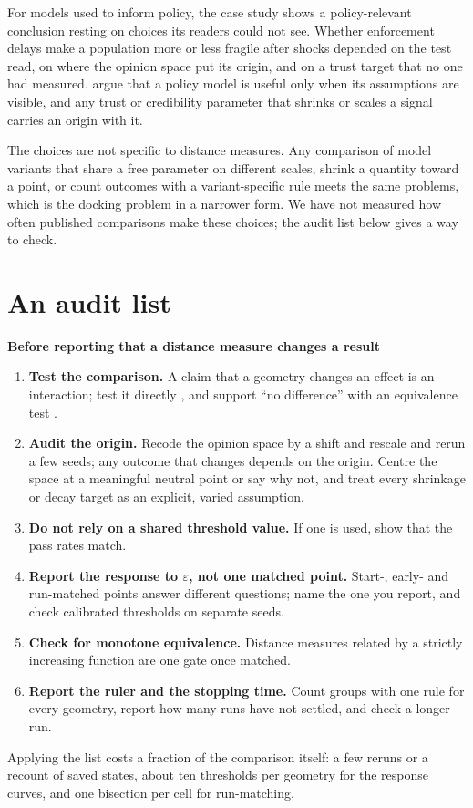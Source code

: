 \documentclass[11pt]{article}
\begin{document}
For models used to inform policy, the case study shows a policy-relevant conclusion resting on choices its readers could not see.
Whether enforcement delays make a population more or less fragile after shocks depended on the test read, on where the opinion space put its origin, and on a trust target that no one had measured.
\citet{gilbert2018} argue that a policy model is useful only when its assumptions are visible, and any trust or credibility parameter that shrinks or scales a signal carries an origin with it.

The choices are not specific to distance measures.
Any comparison of model variants that share a free parameter on different scales, shrink a quantity toward a point, or count outcomes with a variant-specific rule meets the same problems, which is the docking problem \citep{axtell1996,wilensky2007} in a narrower form.
We have not measured how often published comparisons make these choices; the audit list below gives a way to check.

\section{An audit list}
\label{sec:protocol}

\begin{framed}
\noindent\textbf{Before reporting that a distance measure changes a result}
\begin{enumerate}
\item \textbf{Test the comparison.} A claim that a geometry changes an effect is an interaction; test it directly \citep{gelman2006}, and support ``no difference'' with an equivalence test \citep{lakens2017}.
\item \textbf{Audit the origin.} Recode the opinion space by a shift and rescale and rerun a few seeds; any outcome that changes depends on the origin. Centre the space at a meaningful neutral point or say why not, and treat every shrinkage or decay target as an explicit, varied assumption.
\item \textbf{Do not rely on a shared threshold value.} If one is used, show that the pass rates match.
\item \textbf{Report the response to $\varepsilon$, not one matched point.} Start-, early- and run-matched points answer different questions; name the one you report, and check calibrated thresholds on separate seeds.
\item \textbf{Check for monotone equivalence.} Distance measures related by a strictly increasing function are one gate once matched.
\item \textbf{Report the ruler and the stopping time.} Count groups with one rule for every geometry, report how many runs have not settled, and check a longer run.
\end{enumerate}
\end{framed}
\noindent Applying the list costs a fraction of the comparison itself: a few reruns or a recount of saved states, about ten thresholds per geometry for the response curves, and one bisection per cell for run-matching.
\end{document}
